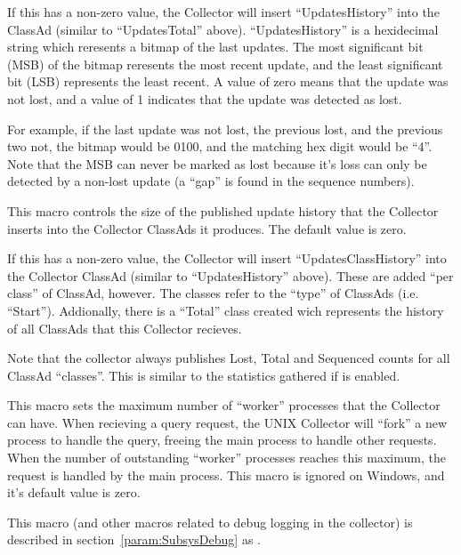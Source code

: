 \begin{description}
  If this has a non-zero value, the Collector will insert
  ``UpdatesHistory'' into the ClassAd (similar to ``UpdatesTotal''
  above).  ``UpdatesHistory'' is a hexidecimal string which reresents
  a bitmap of the last 
  updates.  The most significant bit (MSB) of the bitmap reresents the
  most recent update, and the least significant bit (LSB) represents
  the least recent.  A value of zero means that the update was not
  lost, and a value of 1 indicates that the update was detected as
  lost.

  For example, if the last update was not lost, the previous lost, and
  the previous two not, the bitmap would be 0100, and the matching hex
  digit would be ``4''.  Note that the MSB can never be marked as lost
  because it's loss can only be detected by a non-lost update (a
  ``gap'' is found in the sequence numbers).

\item[\Macro{COLLECTOR\_CLASS\_HISTORY\_SIZE}]
  \label{param:CollectorClassHistorySize} This macro controls the
  size of the published update history that the Collector inserts into
  the Collector ClassAds it produces.  The default value is zero.

  If this has a non-zero value, the Collector will insert
  ``UpdatesClassHistory'' into the Collector ClassAd (similar to
  ``UpdatesHistory'' above).  These are added ``per class'' of
  ClassAd, however.  The classes refer to the ``type'' of ClassAds
  (i.e. ``Start'').  Addionally, there is a ``Total'' class created
  wich represents the history of all ClassAds that this Collector
  recieves.

  Note that the collector always publishes Lost, Total and Sequenced
  counts for all ClassAd ``classes''.  This is similar to the
  statistics gathered if  is enabled.

 \item[\Macro{COLLECTOR\_QUERY\_WORKERS}]
  \label{param:CollectorQueryWorkers} This macro sets the maximum
  number of ``worker'' processes that the Collector can have.  When
  recieving a query request, the UNIX Collector will ``fork'' a new
  process to handle the query, freeing the main process to handle
  other requests.  When the number of outstanding ``worker'' processes
  reaches this maximum, the request is handled by the main process.
  This macro is ignored on Windows, and it's default value is zero.

\item[\Macro{COLLECTOR\_DEBUG}] \label{param:CollectorDebug} This
  macro (and other macros related to debug logging in the collector)
  is described in section~\ref{param:SubsysDebug} as
  .

\end{description}

